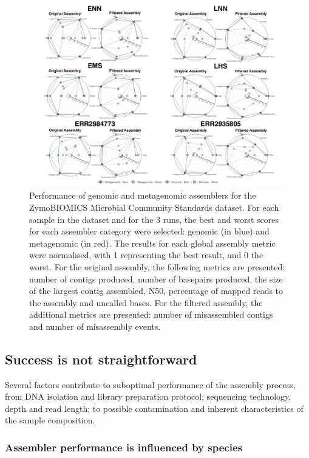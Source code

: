 \begin{figure}[h!]
\centering
\includegraphics[width=\textwidth]{figures/chapter 5/Figure 5.pdf}
\caption{Performance of genomic and metagenomic assemblers for the ZymoBIOMICS Microbial Community Standards dataset. For each sample in the dataset and for the 3 runs, the best and worst scores for each assembler category were selected: genomic (in blue) and metagenomic (in red). The results for each global assembly metric were normalised, with 1 representing the best result, and 0 the worst. For the original assembly, the following metrics are presented: number of contigs produced, number of basepairs produced, the size of the largest contig assembled, N50, percentage of mapped reads to the assembly and uncalled bases.  For the filtered assembly, the additional metrics are presented: number of misassembled contigs and number of misassembly events.}
\label{fig:chap5_figure5}
\end{figure}

\subsection{Success is not straightforward}

Several factors contribute to suboptimal performance of the assembly process, from DNA isolation and library preparation protocol; sequencing technology, depth and read length; to possible contamination and inherent characteristics of the sample composition.

\subsubsection{Assembler performance is influenced by species}

